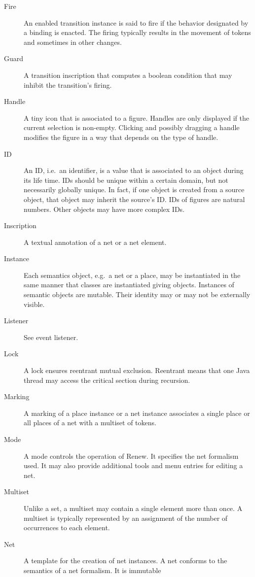 \begin{description}
\item[Fire] An \see enabled
  \see transition instance is said to fire if the behavior
  designated by a \see binding is enacted. The firing typically results
  in the movement of \see tokens and sometimes in other changes.
\item[Guard] A \see transition \see inscription that computes
  a boolean condition that may inhibit the transition's
  \see firing.
\item[Handle] A tiny icon that is associated to a \see figure.
  Handles are only displayed if the current \see selection
  is non-empty. Clicking and possibly dragging a handle
  modifies the figure in a way that depends on the type
  of handle.
\item[ID] An ID, i.e.~an identifier, is a value that is associated
  to an object during its life time. IDs should be unique within
  a certain domain, but not necessarily globally unique.
  In fact, if one object is created from a source object, that object
  may inherit the source's ID.
  IDs of \see figures are natural numbers. Other objects may
  have more complex IDs.
\item[Inscription] A textual annotation of a \see net or a net element.
\item[Instance] Each semantics object, e.g.~a net or a place, may be
  instantiated in the same manner that classes are instantiated giving
  objects. Instances of semantic objects are mutable. Their identity
  may or may not be externally visible.
\item[Listener] See \see event listener.
\item[Lock] A lock ensures reentrant mutual exclusion. Reentrant
  means that one Java thread may access the critical section during
  recursion.
\item[Marking] A marking of a place instance or a net instance
  associates a single place or all places of a net with
  a \see multiset of \see tokens.
\item[Mode] A mode controls the operation of Renew. It specifies the
  \see net formalism used. It may also provide additional \see tools
  and menu entries for editing a \see net.
\item[Multiset] Unlike a set, a multiset may contain a single element
  more than once. A multiset is typically represented by an assignment
  of the number of occurrences to each element.
\item[Net] A template for the creation of \see net instances.
  A net conforms to the semantics of a \see net formalism. It is immutable

\end{description}
